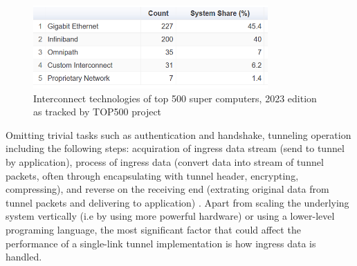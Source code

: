 

\begin{figure}[H]
	\centering
	\includegraphics[width=0.8\textwidth]{resources/images/Interconnect_Technologies_500_supercomp.PNG}
	\caption{Interconnect technologies of top 500 super computers, 2023 edition as tracked by TOP500 project \cite{Interconnect_Technologies_500_supercomp}}
    \label{fig:introduction:Interconnect_Technologies_500_supercomp}
\end{figure}



Omitting trivial tasks such as authentication and handshake, tunneling operation including the following steps: acquiration of ingress data stream (send to tunnel by application), process of ingress data (convert data into stream of tunnel packets, often through encapsulating with tunnel header, encrypting, compressing), and reverse on the receiving end (extrating original data from tunnel packets and delivering to application) .
Apart from scaling the underlying system vertically (i.e by using more powerful hardware) or using a lower-level programing language, the most significant factor that could affect the performance of a single-link tunnel implementation is how ingress data is handled.




